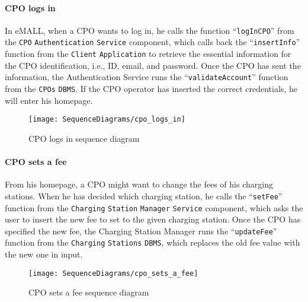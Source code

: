 \paragraph{CPO logs in}
In eMALL, when a CPO wants to log in, he calls the function ``\verb|logInCPO|'' from the \verb|CPO| \verb|Authentication| \verb|Service| component, which calls back the ``\verb|insertInfo|'' function from the \verb|Client| \verb|Application| to retrieve the essential information for the CPO identification, i.e., ID, email, and password.
Once the CPO has sent the information, the Authentication Service runs the ``\verb|validateAccount|'' function from the \verb|CPOs| \verb|DBMS|\@.
If the CPO operator has inserted the correct credentials, he will enter his homepage.
\begin{figure}[H]
    \begin{center}
        \texttt{[image: SequenceDiagrams/cpo\_logs\_in]}
        \caption{CPO logs in sequence diagram}
        \label{cpo_logs_in}
    \end{center}
\end{figure}

\paragraph{CPO sets a fee}
From his homepage, a CPO might want to change the fees of his charging stations.
When he has decided which charging station, he calls the ``\verb|setFee|'' function from the \verb|Charging| \verb|Station| \verb|Manager| \verb|Service| component, which asks the user to insert the new fee to set to the given charging station.
Once the CPO has specified the new fee, the Charging Station Manager runs the ``\verb|updateFee|'' function from the \verb|Charging| \verb|Stations| \verb|DBMS|, which replaces the old fee value with the new one in input.
\begin{figure}[H]
    \begin{center}
        \texttt{[image: SequenceDiagrams/cpo\_sets\_a\_fee]}
        \caption{CPO sets a fee sequence diagram}
        \label{cpo_sets_fee}
    \end{center}
\end{figure}

